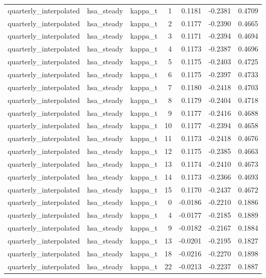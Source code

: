 \begin{tabular}{lllrrrr}
quarterly\_interpolated & hsa\_steady & kappa\_t & 1 & 0.1181 & -0.2381 & 0.4709 \\
quarterly\_interpolated & hsa\_steady & kappa\_t & 2 & 0.1177 & -0.2390 & 0.4665 \\
quarterly\_interpolated & hsa\_steady & kappa\_t & 3 & 0.1171 & -0.2394 & 0.4694 \\
quarterly\_interpolated & hsa\_steady & kappa\_t & 4 & 0.1173 & -0.2387 & 0.4696 \\
quarterly\_interpolated & hsa\_steady & kappa\_t & 5 & 0.1175 & -0.2403 & 0.4725 \\
quarterly\_interpolated & hsa\_steady & kappa\_t & 6 & 0.1175 & -0.2397 & 0.4733 \\
quarterly\_interpolated & hsa\_steady & kappa\_t & 7 & 0.1180 & -0.2418 & 0.4703 \\
quarterly\_interpolated & hsa\_steady & kappa\_t & 8 & 0.1179 & -0.2404 & 0.4718 \\
quarterly\_interpolated & hsa\_steady & kappa\_t & 9 & 0.1177 & -0.2416 & 0.4688 \\
quarterly\_interpolated & hsa\_steady & kappa\_t & 10 & 0.1177 & -0.2394 & 0.4658 \\
quarterly\_interpolated & hsa\_steady & kappa\_t & 11 & 0.1173 & -0.2418 & 0.4676 \\
quarterly\_interpolated & hsa\_steady & kappa\_t & 12 & 0.1175 & -0.2385 & 0.4663 \\
quarterly\_interpolated & hsa\_steady & kappa\_t & 13 & 0.1174 & -0.2410 & 0.4673 \\
quarterly\_interpolated & hsa\_steady & kappa\_t & 14 & 0.1173 & -0.2366 & 0.4693 \\
quarterly\_interpolated & hsa\_steady & kappa\_t & 15 & 0.1170 & -0.2437 & 0.4672 \\
quarterly\_interpolated & hsa\_steady & kappa\_t & 0 & -0.0186 & -0.2210 & 0.1886 \\
quarterly\_interpolated & hsa\_steady & kappa\_t & 4 & -0.0177 & -0.2185 & 0.1889 \\
quarterly\_interpolated & hsa\_steady & kappa\_t & 9 & -0.0182 & -0.2167 & 0.1884 \\
quarterly\_interpolated & hsa\_steady & kappa\_t & 13 & -0.0201 & -0.2195 & 0.1827 \\
quarterly\_interpolated & hsa\_steady & kappa\_t & 18 & -0.0216 & -0.2270 & 0.1898 \\
quarterly\_interpolated & hsa\_steady & kappa\_t & 22 & -0.0213 & -0.2237 & 0.1887 \\

\end{tabular}
